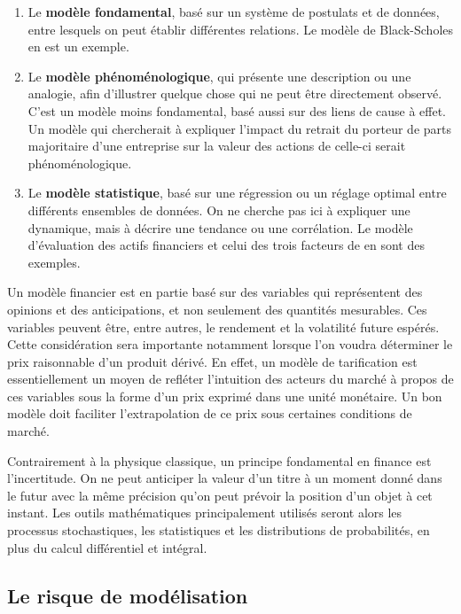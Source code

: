 \begin{enumerate}
\item Le \textbf{modèle fondamental}, basé sur un système de postulats
  et de données, entre lesquels on peut établir différentes
  relations. Le modèle de Black-Scholes en est un exemple.
\item Le \textbf{modèle phénoménologique}, qui présente une
  description ou une analogie, afin d'illustrer quelque chose qui ne
  peut être directement observé. C'est un modèle moins fondamental,
  basé aussi sur des liens de cause à effet. Un modèle qui chercherait
  à expliquer l'impact du retrait du porteur de parts majoritaire
  d'une entreprise sur la valeur des actions de celle-ci serait
  phénoménologique.
\item Le \textbf{modèle statistique}, basé sur une régression ou un
  réglage optimal entre différents ensembles de données. On ne cherche
  pas ici à expliquer une dynamique, mais à décrire une tendance ou
  une corrélation. Le modèle d'évaluation des actifs financiers et
  celui des trois facteurs de \cite{fama1993common} en sont des exemples.
\end{enumerate}

Un modèle financier est en partie basé sur des variables qui
représentent des opinions et des anticipations, et non seulement des
quantités mesurables. Ces variables peuvent être, entre autres, le
rendement et la volatilité future espérés. Cette considération sera
importante notamment lorsque l'on voudra déterminer le prix
raisonnable d'un produit dérivé. En effet, un modèle de tarification
est essentiellement un moyen de refléter l'intuition des acteurs du
marché à propos de ces variables sous la forme d'un prix exprimé dans
une unité monétaire. Un bon modèle doit faciliter l'extrapolation de
ce prix sous certaines conditions de marché.

Contrairement à la physique classique, un principe fondamental en
finance est l'incertitude. On ne peut anticiper la valeur d'un titre à
un moment donné dans le futur avec la même précision qu'on peut
prévoir la position d'un objet à cet instant. Les outils mathématiques
principalement utilisés seront alors les processus stochastiques, les
statistiques et les distributions de probabilités, en plus du calcul
différentiel et intégral.

\subsection{Le risque de modélisation}
\label{sec:modelerisque}

